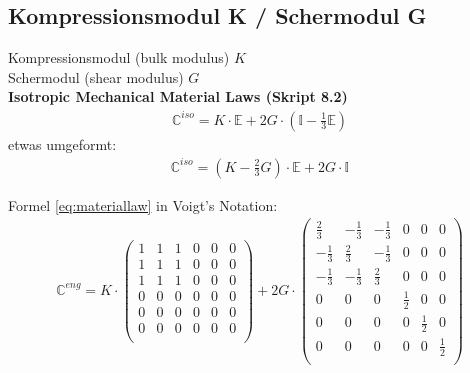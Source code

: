 \documentclass[a4paper]{scrartcl}
\begin{document}
\subsection{Kompressionsmodul K / Schermodul G}

Kompressionsmodul (bulk modulus) $K$\\

Schermodul (shear modulus) $G$\\

\textbf{Isotropic Mechanical Material Laws (Skript 8.2)}\\


\begin{align}\label{eq:materiallaw}
\mathbb{C}^{iso} = K \cdot \mathbb{E} + 2G \cdot (\mathbb{I} - \frac{1}{3}
\mathbb{E})
\end{align}
etwas umgeformt:
\begin{align}
\mathbb{C}^{iso} = (K - \frac{2}{3} G) \cdot \mathbb{E} + 2G \cdot \mathbb{I}
\end{align}

Formel \ref{eq:materiallaw} in Voigt's Notation:
\begin{align}
\mathbb{C}^{eng} = K \cdot \begin{pmatrix}
1 & 1 & 1 & 0 & 0 & 0\\
1 & 1 & 1 & 0 & 0 & 0\\
1 & 1 & 1 & 0 & 0 & 0\\
0 & 0 & 0 & 0 & 0 & 0\\
0 & 0 & 0 & 0 & 0 & 0\\
0 & 0 & 0 & 0 & 0 & 0\\
\end{pmatrix}
+ 2 G \cdot \begin{pmatrix}
\frac{2}{3} & -\frac{1}{3} & -\frac{1}{3} & 0 & 0 & 0\\
-\frac{1}{3} & \frac{2}{3} & -\frac{1}{3} & 0 & 0 & 0\\
-\frac{1}{3} & -\frac{1}{3} & \frac{2}{3} & 0 & 0 & 0\\
0 & 0 & 0 & \frac{1}{2} & 0 & 0\\
0 & 0 & 0 & 0 & \frac{1}{2} & 0\\
0 & 0 & 0 & 0 & 0 & \frac{1}{2}\\
\end{pmatrix}
\end{align}
\end{document}
